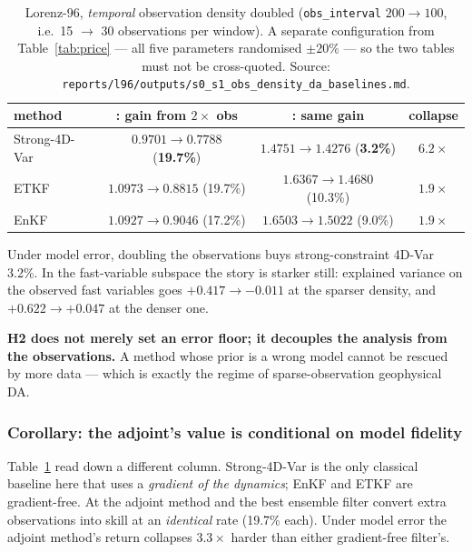 \begin{table}[t]
\centering
\small
\begin{tabular}{@{}lccc@{}}
\toprule
\textbf{method} & \textbf{\Sz{}: gain from $2\times$ obs} & \textbf{\So{}: same gain} & \textbf{collapse} \\
\midrule
Strong-4D-Var & $0.9701 \to 0.7788$ (\textbf{19.7\%}) & $1.4751 \to 1.4276$ (\textbf{3.2\%})  & $\mathbf{6.2\times}$ \\
ETKF          & $1.0973 \to 0.8815$ (19.7\%)          & $1.6367 \to 1.4680$ (10.3\%)          & $1.9\times$ \\
EnKF          & $1.0927 \to 0.9046$ (17.2\%)          & $1.6503 \to 1.5022$ (9.0\%)           & $1.9\times$ \\
\bottomrule
\end{tabular}
\caption{Lorenz-96, \emph{temporal} observation density doubled
(\texttt{obs\_interval} $200 \to 100$, i.e.\ 15 $\to$ 30 observations per
window). A separate configuration from Table~\ref{tab:price} --- all five
parameters randomised $\pm 20\%$ --- so the two tables must not be cross-quoted.
Source: \texttt{reports/l96/outputs/s0\_s1\_obs\_density\_da\_baselines.md}.}
\label{tab:marginal}
\end{table}

Under model error, doubling the observations buys strong-constraint 4D-Var
3.2\%. In the fast-variable subspace the story is starker still: explained
variance on the observed fast variables goes $+0.417 \to -0.011$ at the sparser
density, and $+0.622 \to +0.047$ at the denser one.

\textbf{H2 does not merely set an error floor; it decouples the analysis from the
observations.} A method whose prior is a wrong model cannot be rescued by more
data --- which is exactly the regime of sparse-observation geophysical DA.

\subsubsection{Corollary: the adjoint's value is conditional on model fidelity}
\label{sec:adjoint}

Table~\ref{tab:marginal} read down a different column. Strong-4D-Var is the only
classical baseline here that uses a \emph{gradient of the dynamics}; EnKF and
ETKF are gradient-free. At \Sz{} the adjoint method and the best ensemble filter
convert extra observations into skill at an \emph{identical} rate (19.7\% each).
Under model error the adjoint method's return collapses $3.3\times$ harder than
either gradient-free filter's.

